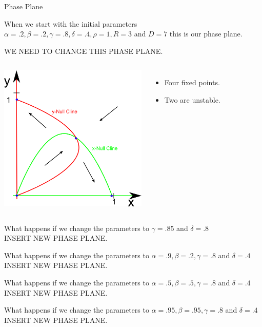 \begin{frame}{Phase Plane}

  \vfill
	
	When we start with the initial parameters $\alpha = .2, \beta = .2, \gamma = .8, \delta = .4, \rho = 1, R = 3$ and $D = 7$ this is our phase plane. 
  
	WE NEED TO CHANGE THIS PHASE PLANE. 
  \begin{columns}
       \includegraphics[height=7cm]{img/typeIPhasePlane}
    \begin{itemize}
    \item Four fixed points.
    \item Two are unstable.
    \end{itemize}
  \end{columns}
\end{frame}

\begin{frame}
 What happens if we change the parameters to $\gamma = .85$ and $\delta = .8$
\\
INSERT NEW PHASE PLANE. 
\end{frame}

\begin{frame}
 What happens if we change the parameters to $\alpha = .9, \beta = .2, \gamma = .8$ and $\delta = .4$
\\
INSERT NEW PHASE PLANE. 
\end{frame}

\begin{frame}
 What happens if we change the parameters to $\alpha = .5, \beta = .5, \gamma = .8$ and $\delta = .4$
\\
INSERT NEW PHASE PLANE. 
\end{frame}

\begin{frame}
 What happens if we change the parameters to $\alpha = .95, \beta = .95, \gamma = .8$ and $\delta = .4$
\\
INSERT NEW PHASE PLANE. 
\end{frame}

